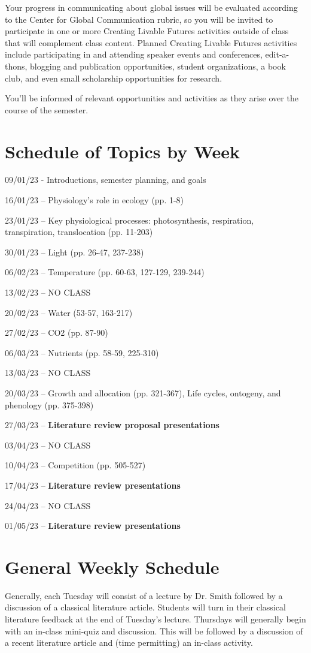 \documentclass[12pt, notitlepage]{article}   	%
\begin{document}
{Your progress in communicating about global issues will be evaluated according to the 
Center for Global Communication rubric, so you will be invited to participate 
in one or more Creating Livable Futures activities outside of class that will 
complement class content. 
Planned Creating Livable Futures activities include participating in and attending 
speaker events and conferences, edit-a-thons, blogging and publication opportunities, 
student organizations, a book club, and even small scholarship opportunities for research. 

You’ll be informed of relevant opportunities and activities as they arise over 
the course of the semester.

\newpage

\section*{Schedule of Topics by Week}
09/01/23 - Introductions, semester planning, and goals \par
16/01/23 – Physiology’s role in ecology (pp. 1-8) \par
23/01/23 – Key physiological processes: 
photosynthesis, respiration, transpiration, translocation (pp. 11-203) \par
30/01/23 – Light (pp. 26-47, 237-238) \par
06/02/23 – Temperature (pp. 60-63, 127-129, 239-244) \par
13/02/23 – NO CLASS \par
20/02/23 – Water (53-57, 163-217) \par
27/02/23 – CO2 (pp. 87-90) \par
06/03/23 – Nutrients (pp. 58-59, 225-310) \par
13/03/23 – NO CLASS \par
20/03/23 – Growth and allocation (pp. 321-367), Life cycles, ontogeny, and phenology (pp. 375-398) \par
27/03/23 – \textbf{Literature review proposal presentations} \par
03/04/23 – NO CLASS \par
10/04/23 – Competition (pp. 505-527) \par
17/04/23 – \textbf{Literature review presentations} \par
24/04/23 – NO CLASS \par
01/05/23 – \textbf{Literature review presentations} \par

\section*{General Weekly Schedule}
Generally, each Tuesday will consist of a lecture by Dr. Smith followed by a discussion
of a classical literature article. Students will turn in their classical literature
feedback at the end of Tuesday's lecture. Thursdays will generally begin with an in-class
mini-quiz and discussion. 
This will be followed by a discussion of a recent literature article and
(time permitting) an in-class activity.

} %
\end{document}

